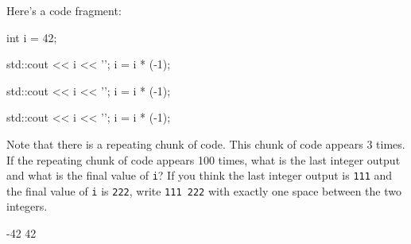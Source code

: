 \nextq
Here's a code fragment:
\begin{console}[commandchars=\@\{\},fontsize=\footnotesize]
int i = 42;

std::cout << i << '\n';
i = i * (-1);

std::cout << i << '\n';
i = i * (-1);

std::cout << i << '\n';
i = i * (-1);
\end{console}
Note that there is a repeating chunk of code.
This chunk of code appears 3 times.
\\
If the repeating chunk of code appears 100 times,
what is the last integer output and
what is the final value of \verb!i!?
If you think the last integer output is \verb!111! and the final
value of \verb!i! is \verb!222!, write \verb!111 222! with
exactly one space between the two integers.
\\
\ANSWER
\begin{answercode}
-42 42
\end{answercode}


